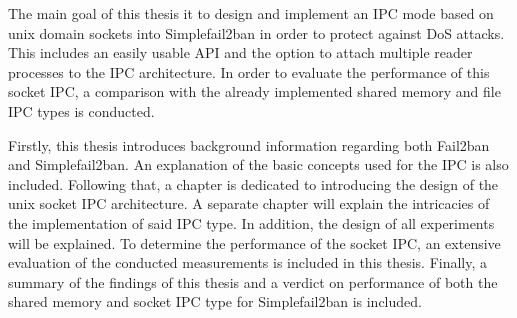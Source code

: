 The main goal of this thesis it to design and implement an \ac{IPC} mode based on unix domain sockets into Simplefail2ban in order to protect against \ac{DoS} attacks.
This includes an easily usable \ac{API} and the option to attach multiple reader processes to the \ac{IPC} architecture.
In order to evaluate the performance of this socket \ac{IPC}, a comparison with the already implemented shared memory and file \ac{IPC} types is conducted.

Firstly, this thesis introduces background information regarding both Fail2ban and Simplefail2ban.
An explanation of the basic concepts used for the \ac{IPC} is also included.
Following that, a chapter is dedicated to introducing the design of the unix socket \ac{IPC} architecture.
A separate chapter will explain the intricacies of the implementation of said \ac{IPC} type.
In addition, the design of all experiments will be explained.
To determine the performance of the socket \ac{IPC}, an extensive evaluation of the conducted measurements is included in this thesis.
Finally, a summary of the findings of this thesis and a verdict on performance of both the shared memory and socket \ac{IPC} type for Simplefail2ban is included.